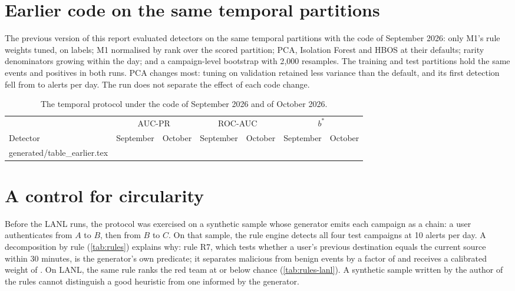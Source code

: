 \documentclass[11pt,a4paper]{article}
\makeatletter
\newcommand{\tablerows}[1]{\@@input #1 }
\makeatother
\begin{document}
\section{Earlier code on the same temporal partitions}
\label{app:earlier}
The previous version of this report evaluated \WideModels{} detectors on the same temporal partitions with the code of September 2026: only M1's rule weights tuned, on labels; M1 normalised by rank over the scored partition; PCA, Isolation Forest and HBOS at their defaults; rarity denominators growing within the day; and a campaign-level bootstrap with 2{,}000 resamples. The training and test partitions hold the same events and positives in both runs. PCA changes most: tuning on validation retained less variance than the default, and its first detection fell from \WidePcaFirstDetection{} to \TempPcaFirstDetection{} alerts per day. The run does not separate the effect of each code change.
\begin{table}[H]
\centering
\footnotesize
\setlength{\tabcolsep}{4pt}
\caption{The temporal protocol under the code of September 2026 and of October 2026.}
\label{tab:earlier}
\begin{tabular}{@{}lllrrrr@{}}
\toprule
& \multicolumn{2}{c}{AUC-PR} & \multicolumn{2}{c}{ROC-AUC} & \multicolumn{2}{c}{$b^{*}$} \\
Detector & September & October & September & October & September & October \\
\midrule
\tablerows{generated/table_earlier.tex}
\bottomrule
\end{tabular}
\end{table}

\section{A control for circularity}
\label{app:circularity}

Before the LANL runs, the protocol was exercised on a synthetic sample whose generator emits each campaign as a chain: a user authenticates from $A$ to $B$, then from $B$ to $C$. On that sample, the rule engine detects all four test campaigns at 10 alerts per day. A decomposition by rule (\cref{tab:rules}) explains why: rule R7, which tests whether a user's previous destination equals the current source within 30 minutes, is the generator's own predicate; it separates malicious from benign events by a factor of \DemoRSevenRatio{} and receives a calibrated weight of \DemoRSevenWeight{}. On LANL, the same rule ranks the red team at or below chance (\cref{tab:rules-lanl}). A synthetic sample written by the author of the rules cannot distinguish a good heuristic from one informed by the generator.
\end{document}
